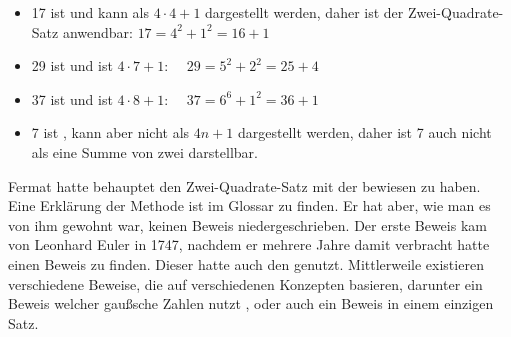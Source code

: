         \begin{itemize}
            \item 17 ist  und kann als $4 \cdot 4 + 1$ dargestellt werden, daher ist der Zwei-Quadrate-Satz anwendbar: $17 = 4^2 + 1^2 = 16 + 1$
            \item 29 ist  und ist $4 \cdot 7 + 1$: $\quad 29 = 5^2 + 2^2 = 25 + 4$
            \item 37 ist  und ist $4 \cdot 8 + 1$: $\quad 37 = 6^6 + 1^2 = 36 + 1$
            \item 7 ist , kann aber nicht als $4n + 1$ dargestellt werden, daher ist 7 auch nicht als eine Summe von zwei  darstellbar.
        \end{itemize}
        
        Fermat hatte behauptet den Zwei-Quadrate-Satz mit der  bewiesen zu haben. Eine Erklärung der Methode ist im Glossar zu finden. Er hat aber, wie man es von ihm gewohnt war, keinen Beweis niedergeschrieben. Der erste Beweis kam von Leonhard Euler in 1747, nachdem er mehrere Jahre damit verbracht hatte einen Beweis zu finden. Dieser hatte auch den  genutzt. 
        Mittlerweile existieren verschiedene Beweise, die auf verschiedenen Konzepten basieren, darunter ein Beweis welcher gaußsche Zahlen nutzt \cite{woodbury}, oder auch ein Beweis in einem einzigen Satz. \cite{zagier}

